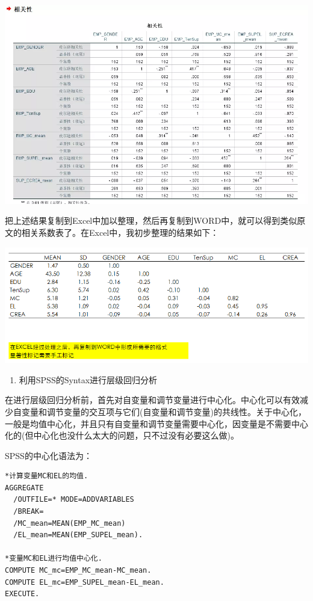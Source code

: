 \documentclass[
]{book}
\providecommand{\tightlist}{%
  \setlength{\itemsep}{0pt}\setlength{\parskip}{0pt}}
\begin{document}
\includegraphics{figs/1316.png}

把上述结果复制到Excel中加以整理，然后再复制到WORD中，就可以得到类似原文的相关系数表了。在Excel中，我初步整理的结果如下：

\includegraphics{figs/1317.png}

\begin{enumerate}
\def\labelenumi{\arabic{enumi}.}
\setcounter{enumi}{1}
\tightlist
\item
  利用SPSS的Syntax进行层级回归分析
\end{enumerate}

在进行层级回归分析前，首先对自变量和调节变量进行中心化。中心化可以有效减少自变量和调节变量的交互项与它们(自变量和调节变量)的共线性。关于中心化，一般是均值中心化，并且只有自变量和调节变量需要中心化，因变量是不需要中心化的(但中心化也没什么太大的问题，只不过没有必要这么做)。

SPSS的中心化语法为：

\begin{verbatim}
*计算变量MC和EL的均值.
AGGREGATE
  /OUTFILE=* MODE=ADDVARIABLES
  /BREAK=
  /MC_mean=MEAN(EMP_MC_mean) 
  /EL_mean=MEAN(EMP_SUPEL_mean).

*变量MC和EL进行均值中心化.
COMPUTE MC_mc=EMP_MC_mean-MC_mean.
COMPUTE EL_mc=EMP_SUPEL_mean-EL_mean.
EXECUTE.
\end{verbatim}
\end{document}

